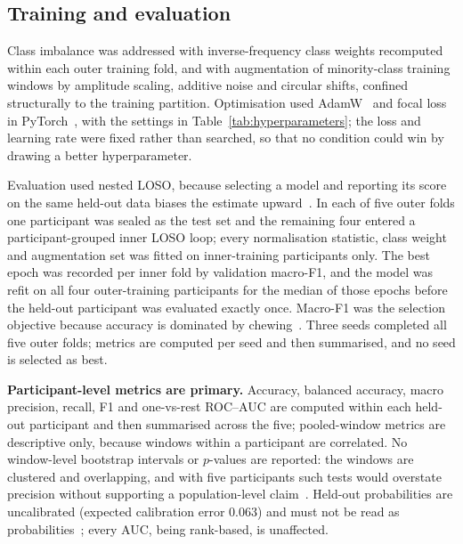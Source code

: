 \documentclass[pdflatex,sn-nature,iicol]{sn-jnl}
\begin{document}
\subsection{Training and evaluation}
\label{sec:training}

Class imbalance was addressed with inverse-frequency class weights recomputed within each outer training fold, and with augmentation of minority-class training windows by amplitude scaling, additive noise and circular shifts, confined structurally to the training partition. Optimisation used AdamW~\cite{loshchilov2019decoupled} and focal loss~\cite{lin2017focal} in PyTorch~\cite{paszke2019pytorch}, with the settings in Table~\ref{tab:hyperparameters}; the loss and learning rate were fixed rather than searched, so that no condition could win by drawing a better hyperparameter.

Evaluation used nested LOSO, because selecting a model and reporting its score on the same held-out data biases the estimate upward~\cite{cawley2010overfitting,varma2006bias}. In each of five outer folds one participant was sealed as the test set and the remaining four entered a participant-grouped inner LOSO loop; every normalisation statistic, class weight and augmentation set was fitted on inner-training participants only. The best epoch was recorded per inner fold by validation macro-F1, and the model was refit on all four outer-training participants for the median of those epochs before the held-out participant was evaluated exactly once. Macro-F1 was the selection objective because accuracy is dominated by chewing~\cite{chicco2020advantages}. Three seeds completed all five outer folds; metrics are computed per seed and then summarised, and no seed is selected as best.

\textbf{Participant-level metrics are primary.} Accuracy, balanced accuracy, macro precision, recall, F1 and one-vs-rest ROC--AUC are computed within each held-out participant and then summarised across the five; pooled-window metrics are descriptive only, because windows within a participant are correlated. No window-level bootstrap intervals or $p$-values are reported: the windows are clustered and overlapping, and with five participants such tests would overstate precision without supporting a population-level claim~\cite{lehmann2006testing,demsar2006statistical}. Held-out probabilities are uncalibrated (expected calibration error 0.063) and must not be read as probabilities~\cite{guo2017calibration}; every AUC, being rank-based, is unaffected.
\end{document}
